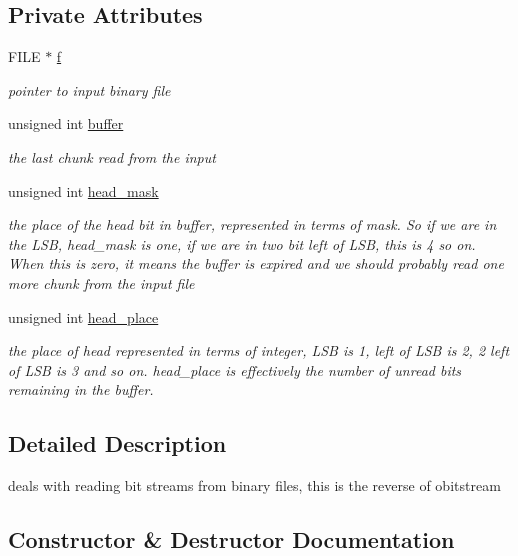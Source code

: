 \subsection*{Private Attributes}
\begin{DoxyCompactItemize}
\item 
F\+I\+LE $\ast$ \hyperlink{classibitstream_a3ea2cdd0cf97820f0e1520c42e364308}{f}
\begin{DoxyCompactList}\small\item\em pointer to input binary file \end{DoxyCompactList}\item 
unsigned int \hyperlink{classibitstream_a73f0b24d3d4402369f1abbb43f7f70ef}{buffer}
\begin{DoxyCompactList}\small\item\em the last chunk read from the input \end{DoxyCompactList}\item 
unsigned int \hyperlink{classibitstream_a48cd41991b6c29ea5120b53873a72a70}{head\+\_\+mask}
\begin{DoxyCompactList}\small\item\em the place of the head bit in buffer, represented in terms of mask. So if we are in the L\+SB, head\+\_\+mask is one, if we are in two bit left of L\+SB, this is 4 so on. When this is zero, it means the buffer is expired and we should probably read one more chunk from the input file \end{DoxyCompactList}\item 
unsigned int \hyperlink{classibitstream_a7b96359ac1534a5565e6e9b0cc53a0b3}{head\+\_\+place}
\begin{DoxyCompactList}\small\item\em the place of head represented in terms of integer, L\+SB is 1, left of L\+SB is 2, 2 left of L\+SB is 3 and so on. head\+\_\+place is effectively the number of unread bits remaining in the buffer. \end{DoxyCompactList}\end{DoxyCompactItemize}


\subsection{Detailed Description}
deals with reading bit streams from binary files, this is the reverse of obitstream 

\subsection{Constructor \& Destructor Documentation}
\mbox{\label{classibitstream_af5f00b64072ed3ffe495b7712a71e3eb}} 
